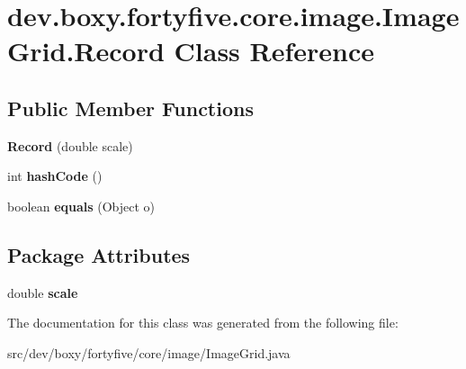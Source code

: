 \hypertarget{classdev_1_1boxy_1_1fortyfive_1_1core_1_1image_1_1_image_grid_1_1_record}{
\section{dev.boxy.fortyfive.core.image.ImageGrid.Record Class Reference}
\label{dc/db8/classdev_1_1boxy_1_1fortyfive_1_1core_1_1image_1_1_image_grid_1_1_record}
}
\subsection*{Public Member Functions}
\begin{DoxyCompactItemize}
\item 
\hypertarget{classdev_1_1boxy_1_1fortyfive_1_1core_1_1image_1_1_image_grid_1_1_record_ad5cda65bc13398303734de099979f435}{
{\bfseries Record} (double scale)}
\label{dc/db8/classdev_1_1boxy_1_1fortyfive_1_1core_1_1image_1_1_image_grid_1_1_record_ad5cda65bc13398303734de099979f435}

\item 
\hypertarget{classdev_1_1boxy_1_1fortyfive_1_1core_1_1image_1_1_image_grid_1_1_record_ab97caed888267aa5197fb8d30e3ef7ee}{
int {\bfseries hashCode} ()}
\label{dc/db8/classdev_1_1boxy_1_1fortyfive_1_1core_1_1image_1_1_image_grid_1_1_record_ab97caed888267aa5197fb8d30e3ef7ee}

\item 
\hypertarget{classdev_1_1boxy_1_1fortyfive_1_1core_1_1image_1_1_image_grid_1_1_record_a7c39bf69049f24aab91102e3269b903b}{
boolean {\bfseries equals} (Object o)}
\label{dc/db8/classdev_1_1boxy_1_1fortyfive_1_1core_1_1image_1_1_image_grid_1_1_record_a7c39bf69049f24aab91102e3269b903b}

\end{DoxyCompactItemize}
\subsection*{Package Attributes}
\begin{DoxyCompactItemize}
\item 
\hypertarget{classdev_1_1boxy_1_1fortyfive_1_1core_1_1image_1_1_image_grid_1_1_record_a96c9a28f4723441b7cd62f35ea8c7ba0}{
double {\bfseries scale}}
\label{dc/db8/classdev_1_1boxy_1_1fortyfive_1_1core_1_1image_1_1_image_grid_1_1_record_a96c9a28f4723441b7cd62f35ea8c7ba0}

\end{DoxyCompactItemize}


The documentation for this class was generated from the following file:\begin{DoxyCompactItemize}
\item 
src/dev/boxy/fortyfive/core/image/ImageGrid.java\end{DoxyCompactItemize}
